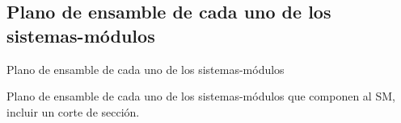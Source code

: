 \subsection{Plano de ensamble de cada uno de los sistemas-m\'odulos}
\label{Plano_ensamble}

Plano de ensamble de cada uno de los sistemas-m\'odulos

Plano de ensamble de cada uno de los sistemas-módulos que componen al SM, incluir un corte de sección.